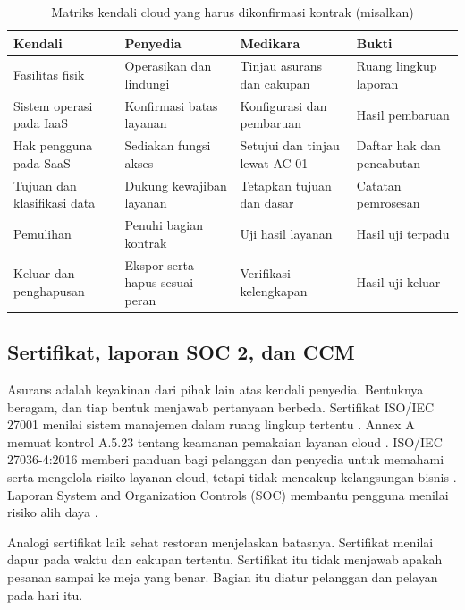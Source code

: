 \begin{table}[!htb]
  \centering\small
  \caption{Matriks kendali cloud yang harus dikonfirmasi kontrak (misalkan)}\label{tab:ch09-matriks}
  \begin{tabularx}{\textwidth}{|>{\raggedright\arraybackslash}p{}|>{\raggedright\arraybackslash}X|>{\raggedright\arraybackslash}X|>{\raggedright\arraybackslash}p{}|}
    \hline
    \textbf{Kendali} & \textbf{Penyedia} & \textbf{Medikara} & \textbf{Bukti} \\ \hline
    Fasilitas fisik & Operasikan dan lindungi & Tinjau asurans dan cakupan & Ruang lingkup laporan
    \\ \hline
    Sistem operasi pada IaaS & Konfirmasi batas layanan & Konfigurasi dan pembaruan & Hasil
    pembaruan \\ \hline
    Hak pengguna pada SaaS & Sediakan fungsi akses & Setujui dan tinjau lewat AC-01 & Daftar hak dan
    pencabutan \\ \hline
    Tujuan dan klasifikasi data & Dukung kewajiban layanan & Tetapkan tujuan dan dasar & Catatan
    pemrosesan \\ \hline
    Pemulihan & Penuhi bagian kontrak & Uji hasil layanan & Hasil uji terpadu \\ \hline
    Keluar dan penghapusan & Ekspor serta hapus sesuai peran & Verifikasi kelengkapan & Hasil uji
    keluar \\ \hline
  \end{tabularx}
\end{table}

\subsection*{Sertifikat, laporan SOC 2, dan CCM}

Asurans adalah keyakinan dari pihak lain atas kendali penyedia. Bentuknya beragam, dan tiap bentuk
menjawab pertanyaan berbeda. Sertifikat ISO/IEC 27001 menilai sistem manajemen dalam ruang lingkup
tertentu \cite{iso27001-2022}. Annex A memuat kontrol A.5.23 tentang keamanan pemakaian layanan
cloud \cite{c06-dqs-annexa}. ISO/IEC 27036-4:2016 memberi panduan bagi pelanggan dan penyedia untuk
memahami serta mengelola risiko layanan cloud, tetapi tidak mencakup kelangsungan bisnis
\cite{c09-iso27036-4}. Laporan System and Organization Controls (SOC) membantu pengguna menilai
risiko alih daya \cite{c09-aicpa-soc}.

Analogi sertifikat laik sehat restoran menjelaskan batasnya. Sertifikat menilai dapur pada waktu dan
cakupan tertentu. Sertifikat itu tidak menjawab apakah pesanan sampai ke meja yang benar. Bagian itu
diatur pelanggan dan pelayan pada hari itu.

